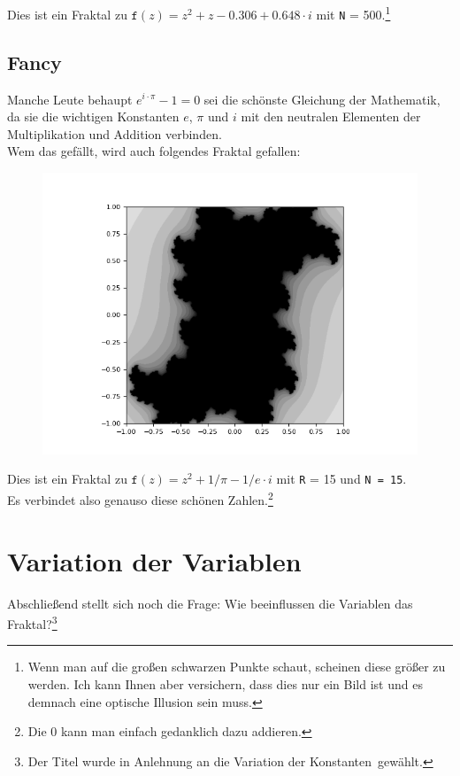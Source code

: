 \documentclass[12pt]{scrartcl}
\begin{document}
Dies ist ein Fraktal zu $\texttt{f}(z) = z^2 + z - 0.306 + 0.648 \cdot i$ mit \texttt{N} = 500.\footnote[3]{Wenn man auf die großen schwarzen Punkte schaut, scheinen diese größer zu werden. Ich kann Ihnen aber versichern, dass dies nur ein Bild ist und es demnach eine optische Illusion sein muss.}

\subsection{Fancy}
Manche Leute behaupt $e^{i \cdot \pi} - 1 = 0$ sei die schönste Gleichung der Mathematik, da sie die wichtigen Konstanten $e$, $\pi$ und $i$ mit den neutralen Elementen der Multiplikation und Addition verbinden.\\
Wem das gefällt, wird auch folgendes Fraktal gefallen:\\

\begin{figure}[H]
\centering
\includegraphics[scale=0.5]{Fancy0.png}
\caption{}
\label{Fancy0}
\end{figure}

Dies ist ein Fraktal zu $\texttt{f}(z) = z^2 + 1/\pi - 1/e \cdot i$ mit \texttt{R} = 15 und \texttt{N = 15}.\\
Es verbindet also genauso diese schönen Zahlen.\footnote[4]{Die $0$ kann man einfach gedanklich dazu addieren.}

\section{Variation der Variablen}
Abschließend stellt sich noch die Frage: Wie beeinflussen die Variablen das Fraktal?\footnote[5]{Der Titel wurde in Anlehnung an die \glqq Variation der Konstanten\grqq ~gewählt.}
\end{document}
